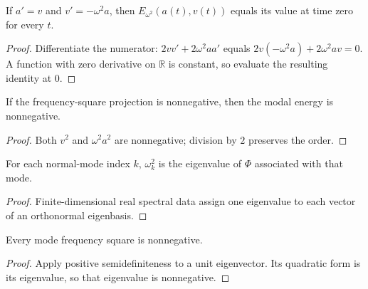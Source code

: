 \begin{theorem}
\label{thm:harmonic:modal-energy-conserved-api}
If $a'=v$ and $v'=-\omega^2a$, then $E_{\omega^2}(a(t),v(t))$ equals its value
at time zero for every $t$.
\end{theorem}
\begin{proof}

\leanok
Differentiate the numerator: $2vv'+2\omega^2aa'$
equals $2v(-\omega^2a)+2\omega^2av=0$.  A function with zero derivative on
$\mathbb R$ is constant, so evaluate the resulting identity at $0$.
\end{proof}

\begin{theorem}
\label{thm:harmonic:modal-energy-nonneg-api}
If the frequency-square projection is nonnegative, then the modal energy is
nonnegative.
\end{theorem}
\begin{proof}

\leanok
Both $v^2$ and $\omega^2a^2$ are nonnegative; division by $2$ preserves the
order.
\end{proof}

\begin{definition}
\label{def:harmonic:mode-frequency-sq}
For each normal-mode index $k$, $\omega_k^2$ is the eigenvalue of $\Phi$
associated with that mode.
\end{definition}
\begin{proof}

\leanok
Finite-dimensional real spectral data assign one eigenvalue to each vector of
an orthonormal eigenbasis.
\end{proof}

\begin{theorem}
\label{thm:harmonic:mode-frequency-sq-nonneg}
Every mode frequency square is nonnegative.
\end{theorem}
\begin{proof}

\leanok
Apply positive semidefiniteness to a unit eigenvector.  Its quadratic form is
its eigenvalue, so that eigenvalue is nonnegative.
\end{proof}

